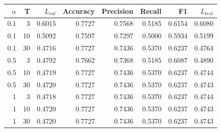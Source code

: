 \begin{tabular}{rrrrrrrr}
\toprule
$\alpha$ & T & $L_{val}$ & Accuracy & Precision & Recall & F1 & $L_{test}$ \\
\midrule
0.1 & 3 & 0.6015 & 0.7727 & 0.7568 & 0.5185 & 0.6154 & 0.6080 \\
0.1 & 10 & 0.5092 & 0.7597 & 0.7297 & 0.5000 & 0.5934 & 0.5199 \\
0.1 & 30 & 0.4716 & 0.7727 & 0.7436 & 0.5370 & 0.6237 & 0.4764 \\
0.5 & 3 & 0.4792 & 0.7662 & 0.7368 & 0.5185 & 0.6087 & 0.4890 \\
0.5 & 10 & 0.4719 & 0.7727 & 0.7436 & 0.5370 & 0.6237 & 0.4744 \\
0.5 & 30 & 0.4720 & 0.7727 & 0.7436 & 0.5370 & 0.6237 & 0.4743 \\
1 & 3 & 0.4718 & 0.7727 & 0.7436 & 0.5370 & 0.6237 & 0.4744 \\
1 & 10 & 0.4720 & 0.7727 & 0.7436 & 0.5370 & 0.6237 & 0.4743 \\
1 & 30 & 0.4720 & 0.7727 & 0.7436 & 0.5370 & 0.6237 & 0.4743 \\
\bottomrule
\end{tabular}
